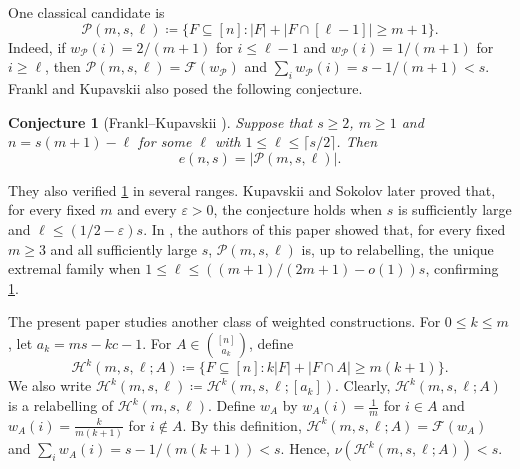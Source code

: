 \documentclass[10pt,a4paper]{article}
\numberwithin{equation}{section}
\newtheorem{conjecture}[conjecture]{Conjecture}
\theoremstyle{definition}
\begin{document}
One classical candidate is
\[
        \mathcal P(m,s,\ell)
        \coloneqq
        \{F\subseteq[n]\colon |F|+|F\cap [\ell-1]|\ge m+1\}.
\]
Indeed, if $w_{\mathcal P}(i)=2/(m+1)$ for $i\le\ell-1$ and $w_{\mathcal P}(i)=1/(m+1)$ for $i\ge\ell$, then $\mathcal P(m,s,\ell)=\mathcal F(w_{\mathcal P})$ and $\sum_i w_{\mathcal P}(i)=s-1/(m+1)<s$.
Frankl and Kupavskii \cite{FKnonuniform} also posed the following conjecture.
\begin{conjecture}[Frankl--Kupavskii \cite{FKnonuniform}]\label{pconj}
        Suppose that $s\ge2$, $m\ge1$ and $n=s(m+1)-\ell$ for some $\ell$ with $1\le\ell\le \lceil s/2\rceil$.
        Then
        \[
                e(n,s)=|\mathcal P(m,s,\ell)|.
        \]
\end{conjecture}
They also verified \cref{pconj} in several ranges.
Kupavskii and Sokolov \cite{KupavskiiSokolovMore} later proved that, for every fixed $m$ and every $\varepsilon>0$, the conjecture holds when $s$ is sufficiently large and $\ell\le(1/2-\varepsilon)s$.
In \cite{ChiWangK1}, the authors of this paper showed that, for every fixed $m\ge3$ and all sufficiently large $s$, $\mathcal P(m,s,\ell)$ is, up to relabelling, the unique extremal family when $1\le\ell\le ((m+1)/(2m+1)-o(1))s$, confirming \cref{pconj}.

The present paper studies another class of weighted constructions.
For $0\le k\le m$, let $a_k=ms-kc-1$.
For $A\in\binom{[n]}{a_k}$, define
\begin{equation}\label{eq:Hfamily-def}
        \mathcal H^k(m,s,\ell;A)
        \coloneqq
        \{F\subseteq[n]:k|F|+|F\cap A|\ge m(k+1)\}.
\end{equation}
We also write $\mathcal H^k(m,s,\ell)\coloneqq\mathcal H^k(m,s,\ell;[a_k])$.
Clearly, $\mathcal H^k(m,s,\ell;A)$ is a relabelling of $\mathcal H^k(m,s,\ell)$.
Define $w_A$ by $w_A(i)=\frac1m$ for $i\in A$ and $w_A(i)=\frac{k}{m(k+1)}$ for $i\notin A$.
By this definition, $\mathcal H^k(m,s,\ell;A)=\mathcal F(w_A)$ and $\sum_i w_A(i)=s-1/(m(k+1))<s$.
Hence, $\nu(\mathcal H^k(m,s,\ell;A))<s$.
\end{document}
